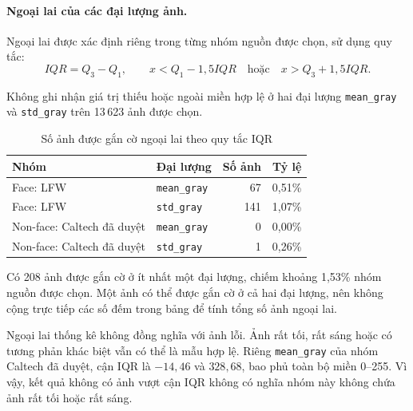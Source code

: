\documentclass[12pt,a4paper,oneside]{report}
\begin{document}
\paragraph{Ngoại lai của các đại lượng ảnh.}

Ngoại lai được xác định riêng trong từng nhóm nguồn
được chọn, sử dụng quy tắc:
\[
IQR = Q_3-Q_1,\qquad
x<Q_1-1{,}5IQR
\quad \text{hoặc} \quad
x>Q_3+1{,}5IQR.
\]

Không ghi nhận giá trị thiếu hoặc ngoài miền hợp lệ
ở hai đại lượng \texttt{mean\_gray} và \texttt{std\_gray}
trên 13\,623 ảnh được chọn.

\begin{table}[H]
    \centering
    \caption{Số ảnh được gắn cờ ngoại lai theo quy tắc IQR}
    \label{tab:ngoailai_iqr}
    \small
    \begin{tabularx}{\textwidth}{
        >{\raggedright\arraybackslash}X l r r}
        \toprule
        \textbf{Nhóm}
        & \textbf{Đại lượng}
        & \textbf{Số ảnh}
        & \textbf{Tỷ lệ} \\
        \midrule

        Face: LFW
        & \texttt{mean\_gray}
        & 67 & 0,51\% \\

        Face: LFW
        & \texttt{std\_gray}
        & 141 & 1,07\% \\

        Non-face: Caltech đã duyệt
        & \texttt{mean\_gray}
        & 0 & 0,00\% \\

        Non-face: Caltech đã duyệt
        & \texttt{std\_gray}
        & 1 & 0,26\% \\

        \bottomrule
    \end{tabularx}
\end{table}

Có 208 ảnh được gắn cờ ở ít nhất một đại lượng,
chiếm khoảng 1,53\% nhóm nguồn được chọn.
Một ảnh có thể được gắn cờ ở cả hai đại lượng,
nên không cộng trực tiếp các số đếm trong bảng
để tính tổng số ảnh ngoại lai.

Ngoại lai thống kê không đồng nghĩa với ảnh lỗi.
Ảnh rất tối, rất sáng hoặc có tương phản khác biệt
vẫn có thể là mẫu hợp lệ.
Riêng \texttt{mean\_gray} của nhóm Caltech đã duyệt,
cận IQR là $-14{,}46$ và $328{,}68$,
bao phủ toàn bộ miền 0--255.
Vì vậy, kết quả không có ảnh vượt cận IQR
không có nghĩa nhóm này không chứa ảnh rất tối
hoặc rất sáng.
\end{document}
